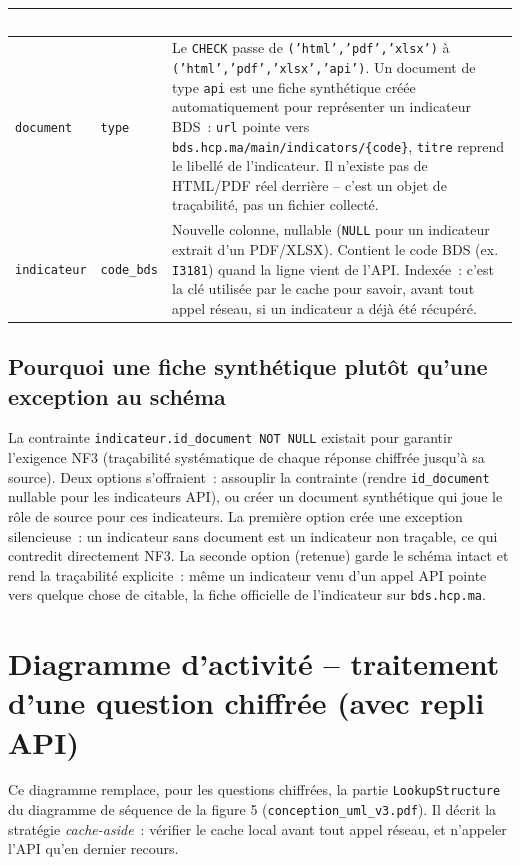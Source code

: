 \documentclass[11pt,a4paper]{article}
\newcommand{\tblhead}[1]{\textcolor{white}{\textbf{#1}}}
\begin{document}
\begin{longtable}{@{}p{3.4cm}p{3cm}p{9.4cm}@{}}
\rowcolor{navy}
\tblhead{Table} & \tblhead{Colonne} & \tblhead{Changement} \\
\midrule
\endhead
\texttt{document} & \texttt{type} & Le \texttt{CHECK} passe de \texttt{('html','pdf','xlsx')} \`a \texttt{('html','pdf','xlsx','api')}. Un document de type \texttt{api} est une fiche synth\'etique cr\'e\'ee automatiquement pour repr\'esenter un indicateur BDS~: \texttt{url} pointe vers \texttt{bds.hcp.ma/main/indicators/\{code\}}, \texttt{titre} reprend le libell\'e de l'indicateur. Il n'existe pas de HTML/PDF r\'eel derri\`ere -- c'est un objet de tra\c{c}abilit\'e, pas un fichier collect\'e. \\
\texttt{indicateur} & \texttt{code\_bds} & Nouvelle colonne, nullable (\texttt{NULL} pour un indicateur extrait d'un PDF/XLSX). Contient le code BDS (ex. \texttt{I3181}) quand la ligne vient de l'API. Index\'ee~: c'est la cl\'e utilis\'ee par le cache pour savoir, avant tout appel r\'eseau, si un indicateur a d\'ej\`a \'et\'e r\'ecup\'er\'e. \\
\end{longtable}

\subsection*{Pourquoi une fiche synth\'etique plut\^ot qu'une exception au sch\'ema}
La contrainte \texttt{indicateur.id\_document NOT NULL} existait pour garantir l'exigence NF3 (tra\c{c}abilit\'e syst\'ematique de chaque r\'eponse chiffr\'ee jusqu'\`a sa source). Deux options s'offraient~: assouplir la contrainte (rendre \texttt{id\_document} nullable pour les indicateurs API), ou cr\'eer un document synth\'etique qui joue le r\^ole de source pour ces indicateurs. La premi\`ere option cr\'ee une exception silencieuse~: un indicateur sans document est un indicateur non tra\c{c}able, ce qui contredit directement NF3. La seconde option (retenue) garde le sch\'ema intact et rend la tra\c{c}abilit\'e explicite~: m\^eme un indicateur venu d'un appel API pointe vers quelque chose de citable, la fiche officielle de l'indicateur sur \texttt{bds.hcp.ma}.

\section{Diagramme d'activit\'e -- traitement d'une question chiffr\'ee (avec repli API)}
Ce diagramme remplace, pour les questions chiffr\'ees, la partie \texttt{LookupStructure} du diagramme de s\'equence de la figure 5 (\texttt{conception\_uml\_v3.pdf}). Il d\'ecrit la strat\'egie \emph{cache-aside}~: v\'erifier le cache local avant tout appel r\'eseau, et n'appeler l'API qu'en dernier recours.
\end{document}
